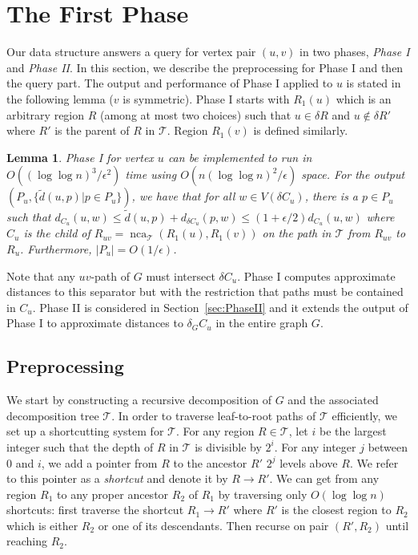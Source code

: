 \documentclass[11pt]{article}
\def\nca{\operatorname{nca}}
\newtheorem{lemma}{Lemma}
\begin{document}
\section{The First Phase}\label{sec:PhaseI}
Our data structure answers a query for vertex pair $(u,v)$ in two phases, \emph{Phase I} and \emph{Phase II}. In this section, we describe the preprocessing for Phase I and then the query part. The output and performance of Phase I applied to $u$ is stated in the following lemma ($v$ is symmetric). Phase I starts with $R_1(u)$ which is an arbitrary region $R$ (among at most two choices) such that $u\in\delta R$ and $u\notin\delta R'$ where $R'$ is the parent of $R$ in $\mathcal T$. Region $R_1(v)$ is defined similarly.
\begin{lemma}\label{Lem:PhaseI}
Phase I for vertex $u$ can be implemented to run in $O((\log\log n)^3/\epsilon^2)$ time using $O(n(\log\log n)^2/\epsilon)$ space. For the output $(P_u,\{\tilde d(u,p) | p\in P_u\})$, we have that for all $w\in V(\delta C_u)$, there is a $p\in P_u$ such that $d_{C_u}(u,w)\leq\tilde d(u,p) + d_{\delta C_u}(p,w)\leq(1+\epsilon/2)d_{C_u}(u,w)$ where $C_u$ is the child of $R_{uv} = \nca_{\mathcal T}(R_1(u),R_1(v))$ on the path in $\mathcal T$ from $R_{uv}$ to $R_u$. Furthermore, $|P_u| = O(1/\epsilon)$.
\end{lemma}
Note that any $uv$-path of $G$ must intersect $\delta C_u$. Phase I computes approximate distances to this separator but with the restriction that paths must be contained in $C_u$. Phase II is considered in Section~\ref{sec:PhaseII} and it extends the output of Phase I to approximate distances to $\delta_G C_u$ in the entire graph $G$.

\subsection{Preprocessing}
We start by constructing a recursive decomposition of $G$ and the associated decomposition tree $\mathcal T$. In order to traverse leaf-to-root paths of $\mathcal T$ efficiently, we set up a shortcutting system for $\mathcal T$. For any region $R\in\mathcal T$, let $i$ be the largest integer such that the depth of $R$ in $\mathcal T$ is divisible by $2^i$. For any integer $j$ between $0$ and $i$, we add a pointer from $R$ to the ancestor $R'$ $2^j$ levels above $R$. We refer to this pointer as a \emph{shortcut} and denote it by $R\rightarrow R'$. We can get from any region $R_1$ to any proper ancestor $R_2$ of $R_1$ by traversing only $O(\log\log n)$ shortcuts: first traverse the shortcut $R_1\rightarrow R'$ where $R'$ is the closest region to $R_2$ which is either $R_2$ or one of its descendants. Then recurse on pair $(R',R_2)$ until reaching $R_2$.
\end{document}
